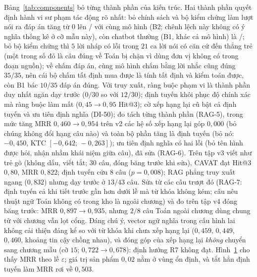 \documentclass[10pt,a4paper,twocolumn]{article}
\begin{document}
Bảng~\ref{tab:components} bỏ từng thành phần của kiến trúc. Hai thành phần quyết định hành vi sư phạm tác động rõ nhất: bỏ chính sách và bộ kiểm chứng làm lượt nói ra đáp án tăng từ $0$ lên \BtwoLeaks{}/\BtwoTurns{} với cùng mô hình (B2; chênh lệch này không có ý nghĩa thống kê ở cỡ mẫu này), còn chatbot thường (B1, khác cả mô hình) là \BoneLeaks{}/\BoneTurns{}; bỏ bộ kiểm chứng thì $5$ lời nháp có lỗi trong $21$ ca lời nói có căn cứ đến thẳng trẻ (một trong số đó là câu đúng về Toán bị chặn vì dùng đơn vị không có trong đoạn nguồn); về chấm đáp án, cùng mô hình chấm bằng lời nhắc cũng đúng $35/35$, nên cái bộ chấm tất định mua được là tính tất định và kiểm toán được, còn B1 bác $10/35$ đáp án đúng. Với truy xuất, ràng buộc phạm vi là thành phần duy nhất ngăn dạy trước ($0/30$ so với $12/30$); định tuyến khôi phục độ chính xác mà ràng buộc làm mất ($0{,}45\to0{,}95$ Hit@3); cờ xếp hạng lại cũ bật cả định tuyến và ưu tiên định nghĩa (DI-50); đo tách từng thành phần (RAG-5), trong mức tăng MRR $0{,}460\to0{,}954$ trên v2 các hệ số xếp hạng lại góp $0{,}000$ (bỏ chúng không đổi hạng câu nào) và toàn bộ phần tăng là định tuyến (bỏ nó: $-0{,}450$, KTC $[-0{,}642;\,-0{,}263]$); ưu tiên định nghĩa có hai lỗi (bỏ tên hình được hỏi, nhận nhầm khái niệm giữa câu), đã sửa (RAG-6). Trên tập v3 viết như trẻ gõ (không dấu, viết tắt; $30$ câu, đóng băng trước khi sửa), CAVAT đạt Hit@3 $0{,}80$, MRR $0{,}822$; định tuyến cứu $8$ câu ($p=0{,}008$); RAG phẳng truy xuất ngang ($0{,}832$) nhưng dạy trước ở $13/43$ câu. Sửa từ các câu trượt đó (RAG-7: định tuyến cả khi tiết trước gần hơn dưới lề mà từ khóa không kém; câu nêu thuật ngữ Toán không có trong kho là ngoài chương) và đo trên tập v4 đóng băng trước: MRR $0{,}897\to0{,}935$, nhưng $2/8$ câu Toán ngoài chương dùng chung từ với chương vẫn lọt cổng. Đáng chú ý, vector ngữ nghĩa trong cấu hình lai không cải thiện đáng kể so với từ khóa khi chưa xếp hạng lại ($0{,}459$, $0{,}449$, $0{,}460$, khoảng tin cậy chồng nhau), và đóng góp của xếp hạng lại \emph{không} chuyển sang chương mẫu (cỡ $15$; $0{,}722\to0{,}678$): định hướng R7 không đạt. Hình~\ref{fig:sweep} cho thấy MRR theo lề $\varepsilon$; giá trị sản phẩm $0{,}02$ nằm ở vùng ổn định, và tắt hẳn định tuyến làm MRR rơi về $0{,}503$.

\begin{figure}[t]
\centering
\begin{minipage}[t]{0.52\textwidth}\vspace{0pt}
\label{tab:ablation}

\end{minipage}\hfill
\begin{minipage}[t]{0.45\textwidth}\vspace{0pt}
\centering

\label{fig:sweep}
\end{minipage}
\end{figure}
\end{document}
